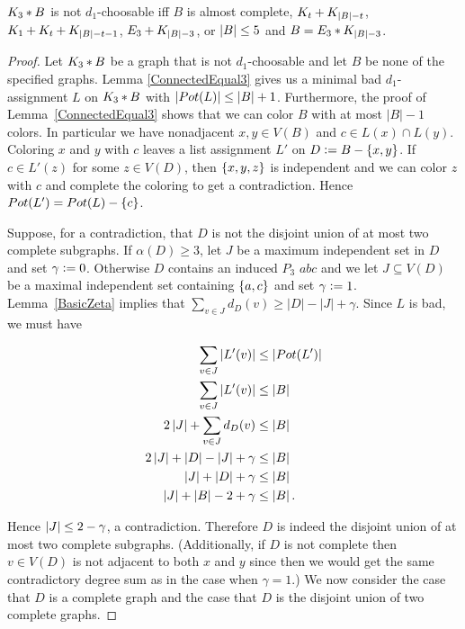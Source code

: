 \begin{lem}\label{ConnectedEqual3Poss}
\label{K3Classification}
$K_3 \mbox{\hspace{2 pt}$\ast$\hspace{2 pt}} B$ is not $d_1$-choosable iff
$B$ is almost complete, $K_t \mbox{\hspace{2 pt}$+$\hspace{2 pt}} K_{\left|B\right| - t}$,
$K_1 \mbox{\hspace{2 pt}$+$\hspace{2 pt}} K_t \mbox{\hspace{2 pt}$+$\hspace{2 pt}} K_{\left|B\right| - t - 1}$, $E_3 \mbox{\hspace{2 pt}$+$\hspace{2 pt}} K_{\left|B\right|
- 3}$, or $\left|B\right| \leq 5$ and $B = E_3 \mbox{\hspace{2 pt}$\ast$\hspace{2 pt}} K_{\left|B\right| - 3}$.
\end{lem}
\begin{proof}
Let $K_3 \mbox{\hspace{2 pt}$\ast$\hspace{2 pt}} B$ be a graph that is not $d_1$-choosable and let $B$ be none
of the specified graphs.  Lemma \ref{ConnectedEqual3} gives us a minimal bad
$d_1$-assignment $L$ on $K_3 \mbox{\hspace{2 pt}$\ast$\hspace{2 pt}} B$ with $\left|Pot(L)\right| \leq \left|B\right| + 1$.
Furthermore, the proof of Lemma~\ref{ConnectedEqual3} shows that we can color $B$ with at most $|B|-1$ colors.  
In particular we have nonadjacent $x, y \in V(B)$ and $c \in L(x) \cap L(y)$.  
Coloring $x$ and $y$ with $c$ leaves a list assignment $L'$ on $D \mathrel{\mathop:}= B - \left\{ x, y \right\}$.  
If $c \in L'(z)$ for some $z \in V(D)$, then $\left\{ x, y, z \right\}$ is independent and we can color $z$ with $c$ and complete the coloring to get a contradiction.  
Hence $Pot(L') = Pot(L) - \left\{ c \right\}$.  

Suppose, for a contradiction, that $D$ is not the disjoint union of at most two
complete subgraphs.  If $\alpha(D) \geq 3$, let $J$ be a maximum independent set in
$D$ and set $\gamma \mathrel{\mathop:}= 0$.  Otherwise $D$ contains an induced $P_3$
$abc$ and we let $J \subseteq V(D)$ be a maximal independent set containing $\left\{ a,
c \right\}$ and set $\gamma \mathrel{\mathop:}= 1$.  Lemma~\ref{BasicZeta} implies that
$\sum_{v\in J}d_D(v)\ge |D|-|J|+\gamma$.  Since $L$ is bad, we must have 

\begin{align*}
\sum_{v \in J} \left|L'(v)\right| &\leq \left|Pot(L')\right| \\
\sum_{v \in J} \left|L'(v)\right| &\leq \left|B\right| \\
2\left|J\right| + \sum_{v \in J} d_D(v) &\leq \left|B\right| \\
2\left|J\right| + \left|D\right| - \left|J\right| + \gamma &\leq \left|B\right| \\
\left|J\right| + \left|D\right| + \gamma &\leq \left|B\right| \\
\left|J\right| + \left|B\right| - 2 + \gamma &\leq \left|B\right|.
\end{align*}

Hence $\left|J\right| \leq 2 - \gamma$, a contradiction.  Therefore $D$ is indeed the
disjoint union of at most two complete subgraphs.  (Additionally, if $D$ is not
complete then $v \in V(D)$ is not adjacent to both $x$ and $y$ since then we
would get the same contradictory degree sum as in the case when $\gamma = 1$.)
We now consider the case that $D$ is a complete graph and the case that $D$ is
the disjoint union of two complete graphs.


\end{proof}
